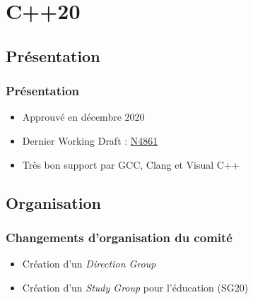 \documentclass[C++.tex]{subfiles}
\begin{document}
\section{C++20}
\subsection*{Présentation}
\begin{frame}
	\frametitle{Présentation}
	\begin{itemize}
		\item Approuvé en décembre 2020
		\item Dernier Working Draft : \href{https://github.com/cplusplus/draft/releases/download/n4861/n4861.pdf}{N4861}
		\item Très bon support par GCC, Clang et Visual C++
	\end{itemize}
\end{frame}

\subsection*{Organisation}
\begin{frame}
	\frametitle{Changements d'organisation du comité}
	\begin{itemize}
		\item Création d'un \textit{Direction Group}
		\item Création d'un \textit{Study Group} pour l'éducation (SG20)
	\end{itemize}

	\centering
\end{frame}
\end{document}
